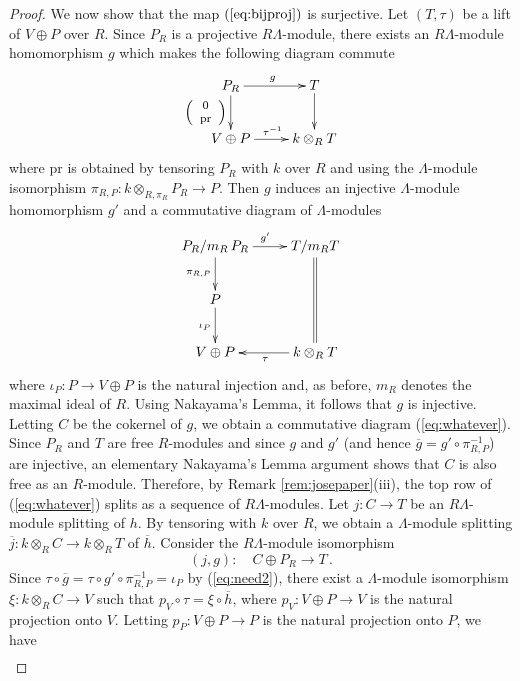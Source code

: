 \documentclass{amsart}
\theoremstyle{plain}
\theoremstyle{definition}
\theoremstyle{remark}
\begin{document}
\begin{proof}
We now show that the map $(\ref{eq:bijproj})$ is surjective. Let $(T,\tau)$ be a lift of $V\oplus P$ over $R$. Since
$P_R$ is a projective $R\Lambda$-module, there exists an $R\Lambda$-module homomorphism $g$ which makes
the following diagram commute
\begin{equation}
\label{eq:need1}
\xymatrix{ P_R\ar[r]^{g} \ar[d]_{\footnotesize{\left(\begin{array}{c}0\\\mathrm{pr}\end{array}\right)}}& T\ar[d]\\
V\oplus P \ar[r]^{\tau^{-1}}&k\otimes_R T}
\end{equation}
where $\mathrm{pr}$ is obtained by tensoring $P_R$ with
$k$ over $R$ and using the $\Lambda$-module isomorphism 
$\pi_{R,P}:k\otimes_{R,\pi_R} P_R\to P$. Then $g$ induces an injective $\Lambda$-module homomorphism
$g'$ and a commutative diagram of $\Lambda$-modules 
\begin{equation}
\label{eq:need2}
\xymatrix{P_R/m_R\,P_R\ar[r]^{g'} \ar[d]_{\pi_{R,P}}& T/m_R T\ar@{=}[dd]\\
P\ar[d]_{\iota_P}&\\
V\oplus P&k\otimes_R T\ar[l]^{\tau}}\\
\end{equation}
where $\iota_P: P \to V\oplus P$ is the natural injection and, 
as before, $m_R$ denotes the maximal ideal of $R$. Using Nakayama's Lemma, it follows that $g$
is injective. Letting $C$ be the cokernel of $g$, we obtain a commutative diagram (\ref{eq:whatever}). Since
$P_R$ and $T$ are free $R$-modules and since $g$ and $g'$ (and hence $\overline{g}=g'\circ \pi_{R,P}^{-1}$) are injective, an
elementary Nakayama's Lemma argument shows that $C$ is also free as an $R$-module. 
Therefore, by Remark \ref{rem:josepaper}(iii), the top row of (\ref{eq:whatever}) splits as a sequence of 
$R\Lambda$-modules. Let $j:C\to T$ be an $R\Lambda$-module splitting of $h$. By tensoring with $k$ over $R$,
we obtain a $\Lambda$-module splitting $\overline{j}:k\otimes_RC \to k\otimes_R T$ of $\overline{h}$.
Consider the $R\Lambda$-module isomorphism
$$(j,g):\quad  C\oplus P_R \to T\,.$$
Since $\tau\circ\overline{g}=\tau\circ g'\circ \pi_{R,P}^{-1}=\iota_P$ by (\ref{eq:need2}),
there exist a $\Lambda$-module isomorphism $\xi:k\otimes_R C\to V$ such that
$p_V\circ\tau = \xi\circ \overline{h}$, where $p_V:V\oplus P \to V$ is the natural projection onto $V$. 
Letting $p_P:V\oplus P \to P$ is the natural projection onto $P$, we have
\begin{eqnarray}

\end{eqnarray}
\end{proof}
\end{document}
